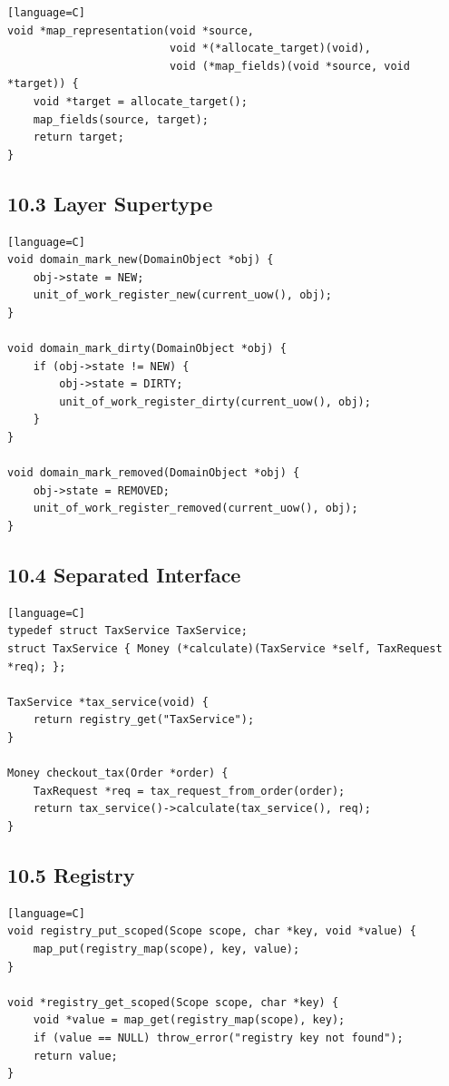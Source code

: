 \documentclass[11pt]{article}
\begin{document}
\begin{verbatim}[language=C]
void *map_representation(void *source,
                         void *(*allocate_target)(void),
                         void (*map_fields)(void *source, void *target)) {
    void *target = allocate_target();
    map_fields(source, target);
    return target;
}
\end{verbatim}

\subsection{10.3 Layer Supertype}\label{layer-supertype}

\begin{verbatim}[language=C]
void domain_mark_new(DomainObject *obj) {
    obj->state = NEW;
    unit_of_work_register_new(current_uow(), obj);
}

void domain_mark_dirty(DomainObject *obj) {
    if (obj->state != NEW) {
        obj->state = DIRTY;
        unit_of_work_register_dirty(current_uow(), obj);
    }
}

void domain_mark_removed(DomainObject *obj) {
    obj->state = REMOVED;
    unit_of_work_register_removed(current_uow(), obj);
}
\end{verbatim}

\subsection{10.4 Separated Interface}\label{separated-interface}

\begin{verbatim}[language=C]
typedef struct TaxService TaxService;
struct TaxService { Money (*calculate)(TaxService *self, TaxRequest *req); };

TaxService *tax_service(void) {
    return registry_get("TaxService");
}

Money checkout_tax(Order *order) {
    TaxRequest *req = tax_request_from_order(order);
    return tax_service()->calculate(tax_service(), req);
}
\end{verbatim}

\subsection{10.5 Registry}\label{registry}

\begin{verbatim}[language=C]
void registry_put_scoped(Scope scope, char *key, void *value) {
    map_put(registry_map(scope), key, value);
}

void *registry_get_scoped(Scope scope, char *key) {
    void *value = map_get(registry_map(scope), key);
    if (value == NULL) throw_error("registry key not found");
    return value;
}
\end{verbatim}
\end{document}
